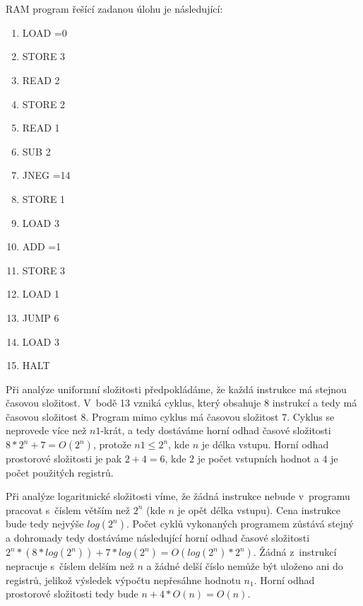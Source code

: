 \documentclass[a4paper]{article}
\begin{document}
\section*{}
RAM program řešící zadanou úlohu je následující:
\begin{enumerate}
    \item LOAD =0
    \item STORE 3
    \item READ 2
    \item STORE 2
    \item READ 1
    \item SUB 2
    \item JNEG =14
    \item STORE 1
    \item LOAD 3
    \item ADD =1
    \item STORE 3
    \item LOAD 1
    \item JUMP 6
    \item LOAD 3
    \item HALT
\end{enumerate}

Při analýze uniformní složitosti předpokládáme, že každá instrukce má stejnou časovou složitost.
V~bodě 13 vzniká cyklus, který obsahuje $8$ instrukcí a tedy má časovou složitost $8$. Program mimo cyklus má časovou složitost $7$.
Cyklus se neprovede více než $n1$-krát, a tedy dostáváme horní odhad časové složitosti $8*2^n+7=O(2^{n})$,
protože $n1 \leq 2^n$, kde $n$ je délka vstupu.
Horní odhad prostorové složitosti je pak $2+4=6$, kde $2$ je počet vstupních hodnot a $4$ je počet použitých registrů. 

Při analýze logaritmické složitosti víme, že žádná instrukce nebude v~programu pracovat s~číslem větším než $2^n$
(kde $n$ je opět délka vstupu).
Cena instrukce bude tedy nejvýše $log(2^n)$.
Počet cyklů vykonaných programem zůstává stejný a dohromady tedy dostáváme následující horní odhad časové složitosti
$2^n*(8*log(2^n))+7*log(2^n)=O(log(2^n)*2^n)$.
Žádná z~instrukcí nepracuje s~číslem delším než $n$ a žádné delší číslo nemůže být uloženo ani do registrů, jelikož výsledek výpočtu
nepřesáhne hodnotu $n_1$. Horní odhad prostorové složitosti tedy bude $n+4*O(n)=O(n)$.
\end{document}
